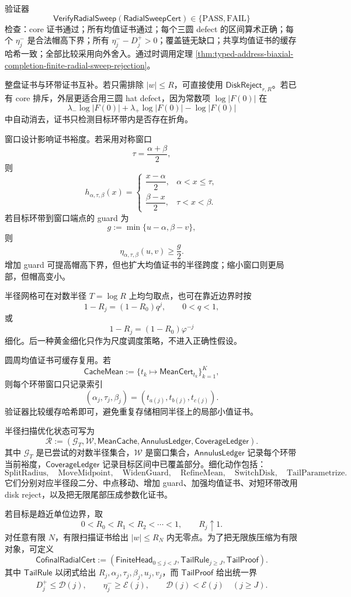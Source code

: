 验证器
\[
\mathsf{VerifyRadialSweep}
(\mathsf{RadialSweepCert})
\in
\{\mathrm{PASS},\mathrm{FAIL}\}
\]
检查：core 证书通过；所有均值证书通过；每个三圆 defect 的区间算术正确；每个 \(\eta_j^-\) 是合法帽高下界；所有 \(\eta_j^- -D_j^+>0\)；覆盖链无缺口；共享均值证书的缓存哈希一致；全部比较采用向外舍入。通过时调用定理 \ref{thm:typed-address-biaxial-completion-finite-radial-sweep-rejection}。

整盘证书与环带证书互补。若只需排除 \(|w|\le R\)，可直接使用 \(\mathsf{DiskReject}_{r,R}\)。若已有 core 排斥，外层更适合用三圆 hat defect，因为常数项 \(\log|F(0)|\) 在
\[
\lambda_-\log|F(0)|
+
\lambda_+\log|F(0)|
-
\log|F(0)|
\]
中自动消去，证书只检测目标环带内是否存在折角。

窗口设计影响证书裕度。若采用对称窗口
\[
\tau=\frac{\alpha+\beta}{2},
\]
则
\[
h_{\alpha,\tau,\beta}(x)
=
\begin{cases}
\dfrac{x-\alpha}{2},&\alpha<x\le\tau,\\[6pt]
\dfrac{\beta-x}{2},&\tau<x<\beta.
\end{cases}
\]
若目标环带到窗口端点的 guard 为
\[
g:=\min\{u-\alpha,\beta-v\},
\]
则
\[
\eta_{\alpha,\tau,\beta}(u,v)\ge \frac g2.
\]
增加 guard 可提高帽高下界，但也扩大均值证书的半径跨度；缩小窗口则更局部，但帽高变小。

半径网格可在对数半径 \(T=\log R\) 上均匀取点，也可在靠近边界时按
\[
1-R_j=(1-R_0)q^j,
\qquad
0<q<1,
\]
或
\[
1-R_j=(1-R_0)\varphi^{-j}
\]
细化。后一种黄金细化只作为尺度调度策略，不进入正确性假设。

圆周均值证书可缓存复用。若
\[
\mathsf{CacheMean}
:=
\{t_k\mapsto\mathsf{MeanCert}_{t_k}\}_{k=1}^K,
\]
则每个环带窗口只记录索引
\[
(\alpha_j,\tau_j,\beta_j)
=
(t_{a(j)},t_{b(j)},t_{c(j)}).
\]
验证器比较缓存哈希即可，避免重复存储相同半径上的局部小值证书。

半径扫描优化状态可写为
\[
\mathcal R
:=
\left(
\mathcal G_T,
\mathcal W,
\mathsf{MeanCache},
\mathsf{AnnulusLedger},
\mathsf{CoverageLedger}
\right).
\]
其中 \(\mathcal G_T\) 是已尝试的对数半径集合，\(\mathcal W\) 是窗口集合，\(\mathsf{AnnulusLedger}\) 记录每个环带当前裕度，\(\mathsf{CoverageLedger}\) 记录目标区间中已覆盖部分。细化动作包括：
\[
\mathrm{SplitRadius},\quad
\mathrm{MoveMidpoint},\quad
\mathrm{WidenGuard},\quad
\mathrm{RefineMean},\quad
\mathrm{SwitchDisk},\quad
\mathrm{TailParametrize}.
\]
它们分别对应半径段二分、中点移动、增加 guard、加强均值证书、对短环带改用 disk reject，以及把无限尾部压成参数化证书。

若目标是趋近单位边界，取
\[
0<R_0<R_1<R_2<\cdots<1,
\qquad
R_j\uparrow1.
\]
对任意有限 \(N\)，有限扫描证书给出 \(|w|\le R_N\) 内无零点。为了把无限族压缩为有限对象，可定义
\[
\mathsf{CofinalRadialCert}
:=
\left(
\mathsf{FiniteHead}_{0\le j<J},
\mathsf{TailRule}_{j\ge J},
\mathsf{TailProof}
\right).
\]
其中 \(\mathsf{TailRule}\) 以闭式给出 \(R_j,\alpha_j,\tau_j,\beta_j,u_j,v_j\)，而 \(\mathsf{TailProof}\) 给出统一界
\[
D_j^+\le\mathcal D(j),
\qquad
\eta_j^-\ge\mathcal E(j),
\qquad
\mathcal D(j)<\mathcal E(j)
\quad(j\ge J).
\]

